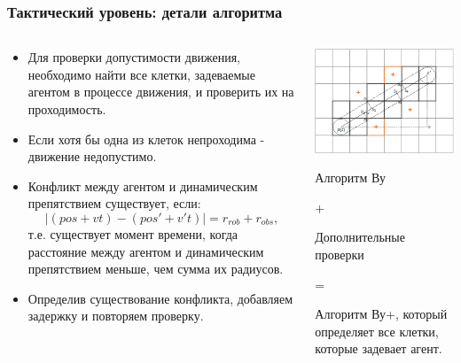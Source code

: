 \documentclass[default]{beamer}
\begin{document}
	\begin{frame}
		\frametitle{Тактический уровень: детали алгоритма}
		\footnotesize
		\begin{columns}
			\begin{column}{0.6\textwidth}
				\begin{itemize}
					\item Для проверки допустимости движения, необходимо найти все клетки, задеваемые агентом в процессе движения, и проверить их на проходимость.
					
					\item Если хотя бы одна из клеток непроходима - движение недопустимо.
					
					\item Конфликт между агентом и динамическим препятствием существует, если:
					\[
					|(pos + vt) - (pos' + v't)| = r_{rob} + r_{obs},
					\]
					т.е. существует момент времени, когда расстояние между агентом и динамическим препятствием меньше, чем сумма их радиусов.
					\item Определив существование конфликта, добавляем задержку и повторяем проверку.
				\end{itemize}
				
			\end{column}
			\begin{column}{0.4\textwidth}
				\centering
				\includegraphics[width=\textwidth]{sippdetails.png}
				\par\bigskip
				Алгоритм Ву
				
				+
				
				\color{orange}Дополнительные проверки
				
				\color{black}=
				
				Алгоритм Ву+, который определяет все клетки, которые задевает агент.
				
			\end{column}
		\end{columns}
	\end{frame}
\end{document}
